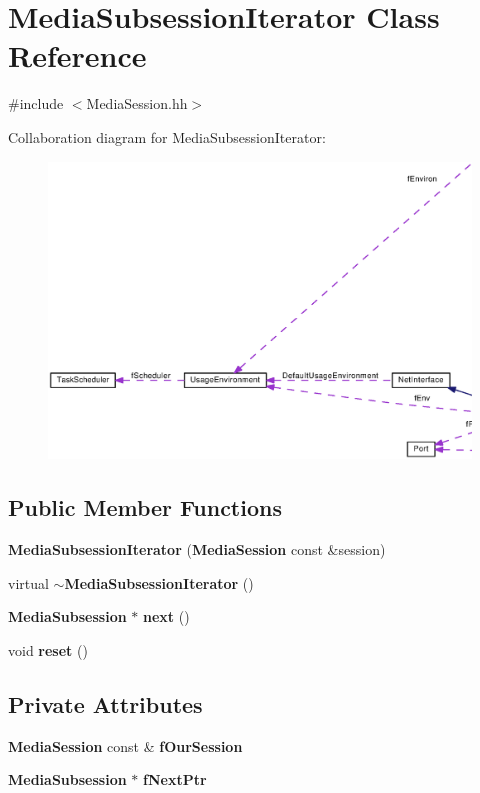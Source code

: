 \section{Media\+Subsession\+Iterator Class Reference}
\label{classMediaSubsessionIterator}


{\ttfamily \#include $<$Media\+Session.\+hh$>$}



Collaboration diagram for Media\+Subsession\+Iterator\+:
\nopagebreak
\begin{figure}[H]
\begin{center}
\leavevmode
\includegraphics[width=350pt]{classMediaSubsessionIterator__coll__graph}
\end{center}
\end{figure}
\subsection*{Public Member Functions}
\begin{DoxyCompactItemize}
\item 
{\bf Media\+Subsession\+Iterator} ({\bf Media\+Session} const \&session)
\item 
virtual {\bf $\sim$\+Media\+Subsession\+Iterator} ()
\item 
{\bf Media\+Subsession} $\ast$ {\bf next} ()
\item 
void {\bf reset} ()
\end{DoxyCompactItemize}
\subsection*{Private Attributes}
\begin{DoxyCompactItemize}
\item 
{\bf Media\+Session} const \& {\bf f\+Our\+Session}
\item 
{\bf Media\+Subsession} $\ast$ {\bf f\+Next\+Ptr}
\end{DoxyCompactItemize}


